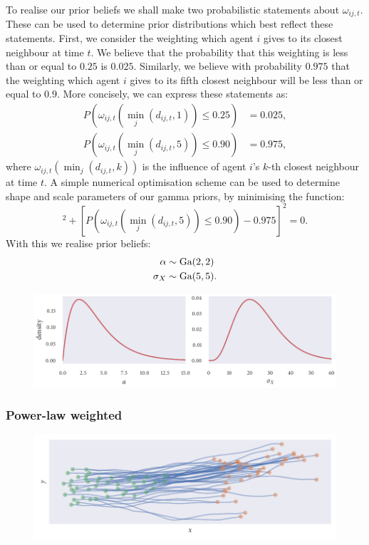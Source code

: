 To realise our prior beliefs we shall make two probabilistic statements about
$\omega_{ij,t}$. These can be used to determine prior distributions which best reflect
these statements. First, we consider the weighting which agent $i$ gives to its closest
neighbour at time $t$. We believe that the probability that this weighting is less than or
equal to $0.25$ is $0.025$. Similarly, we believe with probability $0.975$ that the
weighting which agent $i$ gives to its fifth closest neighbour will be less than or equal
to $0.9$.  More concisely, we can express these statements as:
\begin{align*}
    P(\omega_{ij, t}({\min_j(d_{ij,t}, 1)}) \leq 0.25) &= 0.025, \\
    P(\omega_{ij, t}({\min_j(d_{ij,t}, 5)}) \leq 0.90) &= 0.975,
\end{align*}
where $\omega_{ij, t}({\min_j(d_{ij,t}, k)})$ is the influence of agent $i$'s $k$-th
closest neighbour at time $t$. A simple numerical optimisation scheme can be used to
determine shape and scale parameters of our gamma priors, by minimising the function:
\begin{equation*}
    [P(\omega_{ij, t}({\min_j(d_{ij,t}, 1)}) \leq 0.25) - 0.025]^2
    + [P(\omega_{ij, t}({\min_j(d_{ij,t}, 5)}) \leq 0.90) - 0.975]^2 = 0.
\end{equation*}
With this we realise prior beliefs:
\begin{align*}
    \alpha   & \sim \textrm{Ga}(2, 2) \\
    \sigma_X & \sim \textrm{Ga}(5, 5).
\end{align*}

\begin{figure}[tb]
    \includegraphics{gauss_power_priors.pdf}
    \caption{}
\end{figure}


\subsubsection{Power-law weighted}

\begin{figure}[tb]
    \includegraphics{power_sim.pdf}
    \caption{}
\end{figure}

